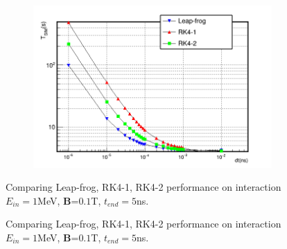 \documentclass[a4paper,oneside,12pt]{report}
\numberwithin{equation}{chapter}
\begin{document}
{\begin{figure}[H]
    \begin{subfigure}{0.9\textwidth}
        \centering
        \includegraphics[width=\linewidth]{./figures/analiz/lf_rk1_rk2_dt-Tsim_3.png}
    \end{subfigure}
    \caption{Comparing Leap-frog, RK4-1, RK4-2 performance on \eB interaction $E_{in}=1$MeV, \textbf{B}=$0.1$T, $t_{end}=5$ns.}
    \label{fig:lf_rk1_rk2_comparison}
\end{figure} \fi
\begin{figure}[H]
    \centering
    \vspace{20pt}
    \vspace{20pt}
    \caption{\centering Comparing Leap-frog, RK4-1, RK4-2 performance on \eB interaction $E_{in}=1$MeV, \textbf{B}=$0.1$T, $t_{end}=5$ns.} 
    \label{fig:lf_rk1_rk2_comparison}
\end{figure}

}
\end{document}
